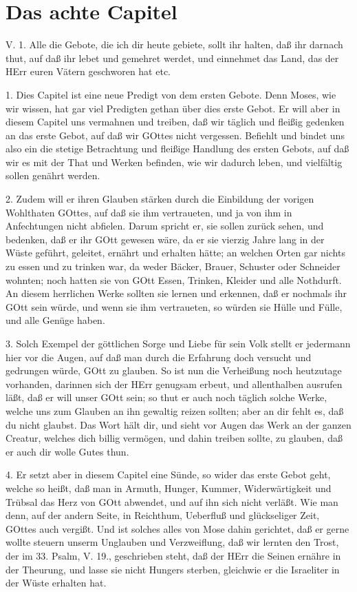 \section{Das achte Capitel}

\begin{schriftzitat}
V. 1. Alle die Gebote, die ich dir heute gebiete, sollt ihr halten, daß ihr darnach thut, auf daß ihr lebet und gemehret werdet, und einnehmet das Land, das der HErr euren Vätern geschworen hat etc.
\end{schriftzitat}

1. Dies Capitel ist eine neue Predigt von dem ersten Gebote. Denn Moses, wie wir wissen, hat gar viel Predigten gethan über dies erste Gebot. Er will aber in diesem Capitel uns vermahnen und treiben, daß wir täglich und fleißig gedenken an das erste Gebot, auf daß wir GOttes nicht vergessen. Befiehlt und bindet uns also ein die stetige Betrachtung und fleißige Handlung des ersten Gebots, auf daß wir es mit der That und Werken befinden, wie wir dadurch leben, und vielfältig sollen genährt werden.

2. Zudem will er ihren Glauben stärken durch die Einbildung der vorigen Wohlthaten GOttes, auf daß sie ihm vertraueten, und ja von ihm in Anfechtungen nicht abfielen. Darum spricht er, sie sollen zurück sehen, und bedenken, daß er ihr GOtt gewesen wäre, da er sie vierzig Jahre lang in der Wüste geführt, geleitet, ernährt und erhalten hätte; an welchen Orten gar nichts zu essen und zu trinken war, da weder Bäcker, Brauer, Schuster oder Schneider wohnten; noch hatten sie von GOtt Essen, Trinken, Kleider und alle Nothdurft. An diesem herrlichen Werke sollten sie lernen und erkennen, daß er nochmals ihr GOtt sein würde, und wenn sie ihm vertraueten, so würden sie Hülle und Fülle, und alle Genüge haben.

3. Solch Exempel der göttlichen Sorge und Liebe für sein Volk stellt er jedermann hier vor die Augen, auf daß man durch die Erfahrung doch versucht und gedrungen würde, GOtt zu glauben. So ist nun die Verheißung noch heutzutage vorhanden, darinnen sich der HErr genugsam erbeut, und allenthalben ausrufen läßt, daß er will unser GOtt sein; so thut er auch noch täglich solche Werke, welche uns zum Glauben an ihn gewaltig reizen sollten; aber an dir fehlt es, daß du nicht glaubst. Das Wort hält dir, und sieht vor Augen das Werk an der ganzen Creatur, welches dich billig vermögen, und dahin treiben sollte, zu glauben, daß er auch dir wolle Gutes thun.

4. Er setzt aber in diesem Capitel eine Sünde, so wider das erste Gebot geht, welche so heißt, daß man in Armuth, Hunger, Kummer, Widerwärtigkeit und Trübsal das Herz von GOtt abwendet, und auf ihn sich nicht verläßt. Wie man denn, auf der andern Seite, in Reichthum, Ueberfluß und glückseliger Zeit, GOttes auch vergißt. Und ist solches alles von Mose dahin gerichtet, daß er gerne wollte steuern unserm Unglauben und Verzweiflung, daß wir lernten den Trost, der im 33. Psalm, V. 19., geschrieben steht, daß der HErr die Seinen ernähre in der Theurung, und lasse sie nicht Hungers sterben, gleichwie er die Israeliter in der Wüste erhalten hat.

